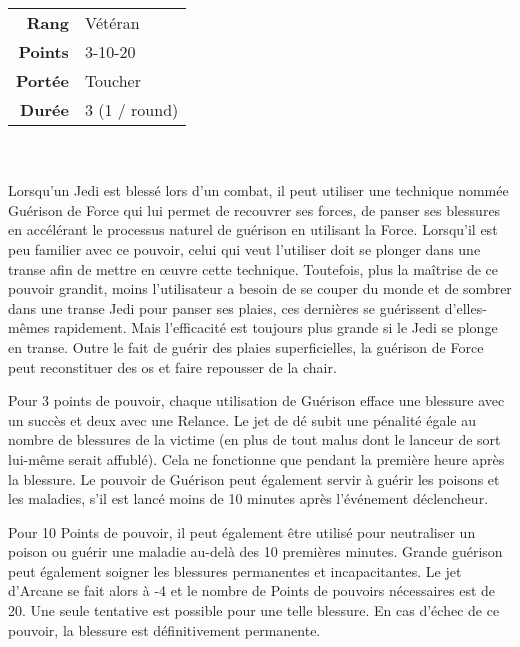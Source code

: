 \begin{description}[align=left]
        \begin{tabular}{ r l }
            \textbf{Rang}    & Vétéran \\
            \textbf{Points}  & 3-10-20 \\
            \textbf{Portée}  & Toucher \\
            \textbf{Durée}   & 3 (1 / round) \\
        \end{tabular}
        \\ \\
        Lorsqu’un Jedi est blessé lors d’un combat, il peut utiliser une technique nommée Guérison de Force qui lui permet de recouvrer ses forces, de panser ses blessures en accélérant le processus naturel de guérison en utilisant la Force. Lorsqu’il est peu familier avec ce pouvoir, celui qui veut l’utiliser doit se plonger dans une transe afin de mettre en \oe{uvre} cette technique. Toutefois, plus la maîtrise de ce pouvoir grandit, moins l’utilisateur a besoin de se couper du monde et de sombrer dans une transe Jedi pour panser ses plaies, ces dernières se guérissent d’elles-mêmes rapidement. Mais l’efficacité est toujours plus grande si le Jedi se plonge en transe. Outre le fait de guérir des plaies superficielles, la guérison de Force peut reconstituer des os et faire repousser de la chair. 

        Pour 3 points de pouvoir, chaque utilisation de Guérison efface une blessure avec un succès et deux avec une Relance. Le jet de dé subit une pénalité égale au nombre de blessures de la victime (en plus de tout malus dont le lanceur de sort lui-même serait affublé). Cela ne fonctionne que pendant la première heure après la blessure. Le pouvoir de Guérison peut également servir à guérir les poisons et les maladies, s’il est lancé moins de 10 minutes après l’événement déclencheur.

        Pour 10 Points de pouvoir, il peut également être utilisé pour neutraliser un poison ou guérir une maladie au-delà des 10 premières minutes. Grande guérison peut également soigner les blessures permanentes et incapacitantes. Le jet d’Arcane se fait alors à -4 et le nombre de Points de pouvoirs nécessaires est de 20. Une seule tentative est possible pour une telle blessure. En cas d’échec de ce pouvoir, la blessure est définitivement permanente.
        \\

    \item [Lumière de la Force] ~ \\


\end{description}
